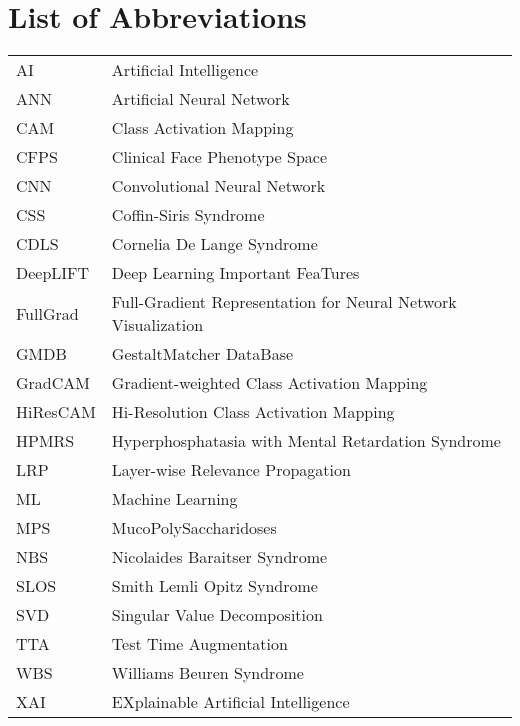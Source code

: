 \documentclass[../report.tex]{subfiles}
\begin{document}
    \chapter{List of Abbreviations}
\begin{table}[H]
	\centering
	\begin{tabular}{ll}
		AI       & Artificial Intelligence                                        \\
		ANN      & Artificial Neural Network                                      \\
		CAM      & Class Activation Mapping                                       \\
		CFPS     & Clinical Face Phenotype Space                                  \\
		CNN      & Convolutional Neural Network                                   \\
		CSS      & Coffin-Siris Syndrome                                          \\
		CDLS     & Cornelia De Lange Syndrome                                     \\
		DeepLIFT & Deep Learning Important FeaTures                               \\
		FullGrad & Full-Gradient Representation for Neural Network Visualization  \\
		GMDB     & GestaltMatcher DataBase                                        \\
		GradCAM  & Gradient-weighted  Class Activation Mapping                    \\
		HiResCAM & Hi-Resolution Class Activation Mapping                         \\
		HPMRS    & Hyperphosphatasia with Mental Retardation Syndrome             \\
		LRP      & Layer-wise Relevance Propagation                               \\
		ML       & Machine Learning                                               \\
		MPS      & MucoPolySaccharidoses                                          \\
		NBS      & Nicolaides Baraitser Syndrome                                  \\
		SLOS     & Smith Lemli Opitz Syndrome                                     \\
		SVD      & Singular Value Decomposition                                   \\
		TTA		 & Test Time Augmentation										  \\
		WBS      & Williams Beuren Syndrome                                       \\
		XAI      & EXplainable Artificial Intelligence                           
	\end{tabular}
\end{table}
\end{document}
